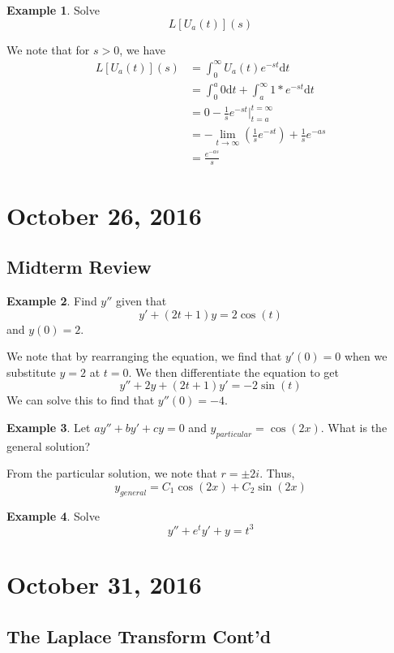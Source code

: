 \documentclass[11pt]{article}
\theoremstyle{plain} %
\theoremstyle{definition}
\theoremstyle{example}
\newtheorem*{example}{Example}
\theoremstyle{remark}
\begin{document}
\begin{example}
	Solve $$L[U_a(t)](s) $$
\end{example}

We note that for $s>0$, we have 
\begin{align*}
	L[U_a(t)](s)  &= \int_0^{\infty}U_a(t)e^{-st} \mathrm d t \\
	&= \int_0^a0 \mathrm d t + \int_a^{\infty}1*e^{-st} \mathrm d t \\
	&= 0 -\frac{1}{s}e^{-st}|_{t=a}^{t=\infty} \\
	&= -\lim_{t \to \infty} \left(\frac{1}{s}e^{-st}\right) + \frac{1}{s}e^{-as} \\
	&= \frac{e^{-as}}{s}
\end{align*}

\section{October 26, 2016}
\subsection{Midterm Review}

\begin{example}
Find $y''$ given that $$y' + (2t+1)y = 2\cos(t)$$ and $y(0) = 2$.
\end{example}

We note that by rearranging the equation, we find that $y'(0) = 0$ when we substitute $y=2$ at $t =0$. We then differentiate the equation to get $$y'' + 2y + (2t+1)y' = -2\sin(t)$$ We can solve this to find that $y''(0) = -4$.

\begin{example}
Let $ay'' + by' + cy = 0$ and $y_{particular} = \cos(2x)$. What is the general solution?
\end{example}

From the particular solution, we note that $r = \pm 2i$. Thus, $$y_{general} = C_1\cos(2x) + C_2\sin(2x)$$

\begin{example}
	Solve $$y'' + e^ty' + y = t^3$$
\end{example}


\section{October 31, 2016}
\subsection{The Laplace Transform Cont'd}
\end{document}
